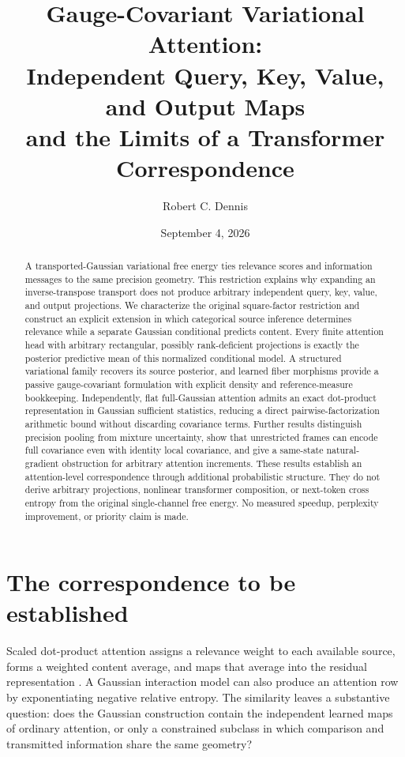\documentclass[11pt]{article}
\title{Gauge-Covariant Variational Attention:\\Independent Query, Key, Value, and Output Maps\\and the Limits of a Transformer Correspondence}
\author{Robert C. Dennis}
\date{September 4, 2026}
\begin{document}
\maketitle

\begin{abstract}
A transported-Gaussian variational free energy ties relevance scores and information messages to the same precision geometry. This restriction explains why expanding an inverse-transpose transport does not produce arbitrary independent query, key, value, and output projections. We characterize the original square-factor restriction and construct an explicit extension in which categorical source inference determines relevance while a separate Gaussian conditional predicts content. Every finite attention head with arbitrary rectangular, possibly rank-deficient projections is exactly the posterior predictive mean of this normalized conditional model. A structured variational family recovers its source posterior, and learned fiber morphisms provide a passive gauge-covariant formulation with explicit density and reference-measure bookkeeping. Independently, flat full-Gaussian attention admits an exact dot-product representation in Gaussian sufficient statistics, reducing a direct pairwise-factorization arithmetic bound without discarding covariance terms. Further results distinguish precision pooling from mixture uncertainty, show that unrestricted frames can encode full covariance even with identity local covariance, and give a same-state natural-gradient obstruction for arbitrary attention increments. These results establish an attention-level correspondence through additional probabilistic structure. They do not derive arbitrary projections, nonlinear transformer composition, or next-token cross entropy from the original single-channel free energy. No measured speedup, perplexity improvement, or priority claim is made.
\end{abstract}

\section{The correspondence to be established}
\label{sec:introduction}
Scaled dot-product attention assigns a relevance weight to each available source, forms a weighted content average, and maps that average into the residual representation \citep{Vaswani2017}. A Gaussian interaction model can also produce an attention row by exponentiating negative relative entropy. The similarity leaves a substantive question: does the Gaussian construction contain the independent learned maps of ordinary attention, or only a constrained subclass in which comparison and transmitted information share the same geometry?
\end{document}
